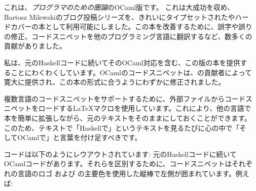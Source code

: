 
\lettrine[lhang=0.17]{こ}{れは}、\emph{プログラマのための圏論}のOCaml版です。
これは大成功を収め、Bartosz Milewskiのブログ投稿シリーズを、きれいにタイプセットされたやハードカバーの本として利用可能にしました。この本を改善するために、誤字や誤りの修正、コードスニペットを他のプログラミング言語に翻訳するなど、数多くの貢献がありました。

私は、元のHaskellコードに続いてそのOCaml対応を含む、この版の本を提供することにわくわくしています。OCamlのコードスニペットは、の貢献者によって寛大に提供され、この本の形式に合うようにわずかに修正されました。

複数言語のコードスニペットをサポートするために、外部ファイルからコードスニペットをロードする\LaTeX{}マクロを使用しています。これにより、他の言語で本を簡単に拡張しながら、元のテキストをそのままにしておくことができます。このため、テキストで「Haskellで」というテキストを見るたびに心の中で「そしてOCamlで」と言葉を付け足すべきです。

コードは以下のようにレウアウトされています: 元のHaskellコードに続いてOCamlコードがあります。それらを区別するために、コードスニペットはそれぞれの言語のロゴ  および  の主要色を使用した縦棒で左側が囲まれています。例えば:

\unskip
{}
\NoIndentAfterThis
